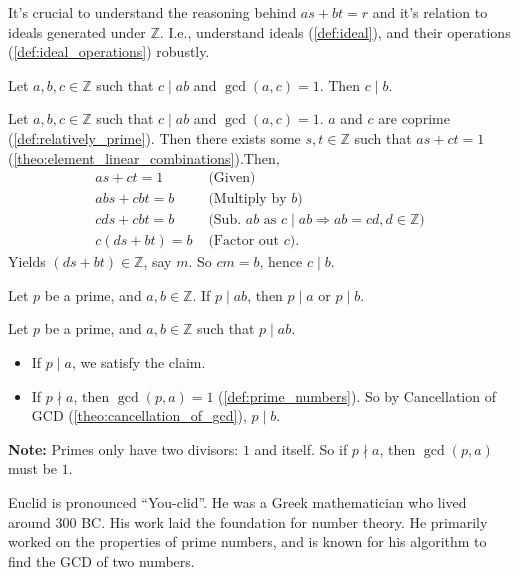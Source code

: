 \begin{Tip}
    It's crucial to understand the reasoning behind $as+bt=r$ and it's relation to ideals generated under $\mathbb{Z}$. I.e., understand ideals (\ref{def:ideal}), and their operations (\ref{def:ideal_operations}) robustly.
\end{Tip}

\newpage 

\begin{theo}

    \label{theo:cancellation_of_gcd}

    Let \( a, b, c \in \mathbb{Z} \) such that \( c \mid ab \) and \( \gcd(a, c) = 1 \). Then \( c \mid b \).
\end{theo}

\begin{Proof}

    Let $a,b,c\in\mathbb{Z}$ such that $c\mid ab$ and $\gcd(a,c)=1$. $a$ and $c$ are coprime (\ref{def:relatively_prime}). Then there exists some $s,t\in\mathbb{Z}$
    such that $as+ct=1$ (\ref{theo:element_linear_combinations}).Then, 
    \begin{align*}
        as+ct=1 & \text{ (Given)}\\
        abs + cbt = b & \text{ (Multiply by $b$)}\\
        cds + cbt = b & \text{ (Sub. $ab$ as $c\mid ab\Rightarrow ab = cd,d\in\mathbb{Z}$)}\\
        c(ds+bt)=b & \text{ (Factor out $c$).}
    \end{align*}
    Yields $(ds+bt)\in\mathbb{Z}$, say $m$. So $cm = b$, hence $c\mid b$.
\end{Proof}

\begin{theo}

    Let \( p \) be a prime, and \( a, b \in \mathbb{Z} \). If \( p \mid ab \), then \( p \mid a \) or \( p \mid b \).
\end{theo}

\begin{Proof}

    Let $p$ be a prime, and $a,b\in\mathbb{Z}$ such that $p\mid ab$.
    \begin{itemize}
        \item If $p\mid a$, we satisfy the claim.
        \item If $p\nmid a$, then $\gcd(p,a)=1$ (\ref{def:prime_numbers}). So by Cancellation of GCD (\ref{theo:cancellation_of_gcd}), $p\mid b$.
    \end{itemize}
\end{Proof}
\begin{Note}
    \textbf{Note:} Primes only have two divisors: $1$ and itself. So if $p\nmid a$, then $\gcd(p,a)$ must be $1$.
\end{Note}
\begin{Tip}
    Euclid is pronounced ``You-clid''. He was a Greek mathematician who lived around 300 BC. His work laid the foundation for number theory.
    He primarily worked on the properties of prime numbers, and is known for his algorithm to find the GCD of two numbers.
\end{Tip}

